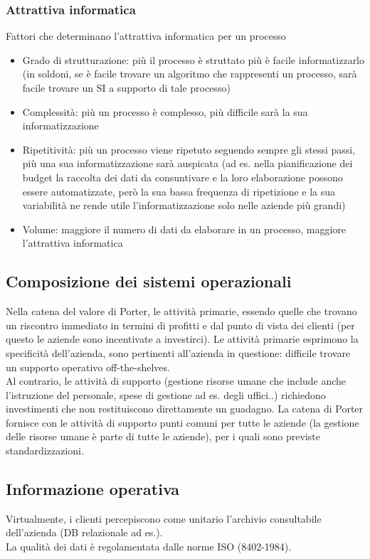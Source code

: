 \begin{itemize}
\subsubsection{Attrattiva informatica}
\label{subs:Attrattiva informatica}
Fattori che determinano l'attrattiva informatica per un processo
\begin{itemize}
  \item Grado di strutturazione: pi\`u il processo \`e struttato pi\`u \`e facile
  informatizzarlo (in soldoni, se \`e facile trovare un algoritmo che rappresenti un processo, sar\`a
  facile trovare un SI a supporto di tale processo)
  \item Complessit\`a: pi\`u un processo \`e complesso, pi\`u difficile sar\`a
  la sua informatizzazione
  \item Ripetitivit\`a: pi\`u un processo viene ripetuto seguendo sempre
  gli stessi passi, pi\`u una sua informatizzazione sar\`a auspicata
  (ad es. nella pianificazione dei budget la raccolta dei dati da consuntivare e la loro elaborazione
  possono essere automatizzate, per\`o la sua bassa frequenza di ripetizione e la sua variabilit\`a
  ne rende utile l'informatizzazione solo nelle aziende pi\`u grandi)
  \item Volume: maggiore il numero di dati da elaborare in un processo, maggiore
  l'attrattiva informatica
\end{itemize}

\subsection{Composizione dei sistemi operazionali}
\label{sub:Composizione dei sistemi operazionali}
Nella catena del valore di Porter, le attivit\`a primarie, essendo quelle che
trovano un riscontro immediato in termini di profitti e dal punto di vista dei clienti
(per questo le aziende sono incentivate a investirci).
Le attivit\`a primarie esprimono la specificit\`a dell'azienda, sono
pertinenti all'azienda in questione: difficile trovare un supporto operativo off-the-shelves.\\
Al contrario, le attivit\`a di supporto (gestione risorse umane che include anche l'istruzione
del personale, spese di gestione ad es. degli uffici..) richiedono investimenti che non
restituiscono direttamente un guadagno.
La catena di Porter fornisce con le attivit\`a di supporto punti comuni per tutte le aziende (la gestione
delle risorse umane \`e parte di tutte le aziende), per i quali sono previste
standardizzazioni.
\subsection{Informazione operativa}
\label{sub:Informazione operativa}
Virtualmente, i clienti percepiscono come unitario l'archivio consultabile
dell'azienda (DB relazionale ad es.).\\
La qualit\`a dei dati \`e regolamentata dalle norme ISO (8402-1984).

\end{itemize}
